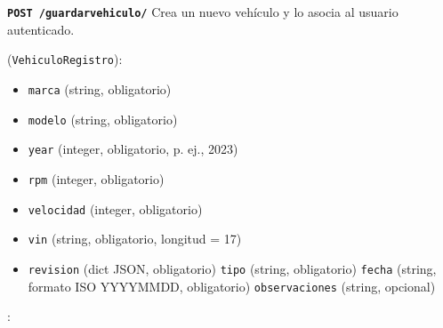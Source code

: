 \documentclass[a4paper,11pt,spanish]{sphinxmanual}
\newcommand{\robotoMonoBold}{\fontseries{b}\selectfont\ttfamily}
\renewcommand{\sphinxcode}[1]{\textcolor{sphinxorangeCode}{{\robotoMonoBold #1}}}
\renewcommand{\sphinxbfcode}[1]{\textbf{\sphinxcode{#1}}}
\renewcommand{\sphinxupquote}[1]{\texttt{#1}}
\begin{document}
\begin{fulllineitems}
\label{\detokenize{endpoints:post--guardar-vehiculo-}}
\pysigstartsignatures
\pysigline
{\sphinxbfcode{\sphinxupquote{POST~}}\sphinxbfcode{\sphinxupquote{/guardar\sphinxhyphen{}vehiculo/}}}
\pysigstopsignatures
\sphinxAtStartPar
Crea un nuevo vehículo y lo asocia al usuario autenticado.

\sphinxAtStartPar
{} (\sphinxcode{\sphinxupquote{VehiculoRegistro}}):
\begin{itemize}
\item {} 
\sphinxAtStartPar
\sphinxcode{\sphinxupquote{marca}} (string, obligatorio)

\item {} 
\sphinxAtStartPar
\sphinxcode{\sphinxupquote{modelo}} (string, obligatorio)

\item {} 
\sphinxAtStartPar
\sphinxcode{\sphinxupquote{year}} (integer, obligatorio, p. ej., 2023)

\item {} 
\sphinxAtStartPar
\sphinxcode{\sphinxupquote{rpm}} (integer, obligatorio)

\item {} 
\sphinxAtStartPar
\sphinxcode{\sphinxupquote{velocidad}} (integer, obligatorio)

\item {} 
\sphinxAtStartPar
\sphinxcode{\sphinxupquote{vin}} (string, obligatorio, longitud = 17)

\item {} 
\sphinxAtStartPar
\sphinxcode{\sphinxupquote{revision}} (dict JSON, obligatorio)
\sphinxhyphen{} \sphinxcode{\sphinxupquote{tipo}} (string, obligatorio)
\sphinxhyphen{} \sphinxcode{\sphinxupquote{fecha}} (string, formato ISO YYYY\sphinxhyphen{}MM\sphinxhyphen{}DD, obligatorio)
\sphinxhyphen{} \sphinxcode{\sphinxupquote{observaciones}} (string, opcional)

\end{itemize}

\sphinxAtStartPar
{}:

\begin{sphinxVerbatim}[commandchars=\\\{\}]
  
 
 
 


\end{sphinxVerbatim}
\end{fulllineitems}
\end{document}
